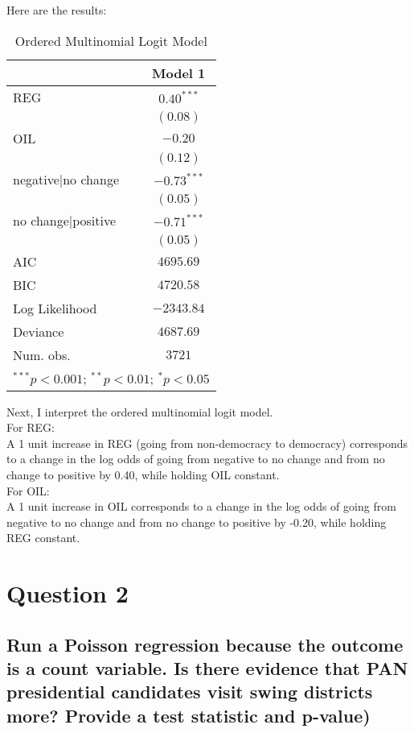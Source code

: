 \documentclass{article}
\begin{document}
Here are the results:
\begin{table} [H]
\begin{center}
\begin{tabular}{l c}
\hline
 & Model 1 \\
\hline
REG                & $0.40^{***}$  \\
                   & $(0.08)$      \\
OIL                & $-0.20$       \\
                   & $(0.12)$      \\
negative|no change & $-0.73^{***}$ \\
                   & $(0.05)$      \\
no change|positive & $-0.71^{***}$ \\ 
                   & $(0.05)$      \\
\hline
AIC                & $4695.69$     \\
BIC                & $4720.58$     \\
Log Likelihood     & $-2343.84$    \\
Deviance           & $4687.69$     \\
Num. obs.          & $3721$        \\
\hline
\multicolumn{2}{l}{\scriptsize{$^{***}p<0.001$; $^{**}p<0.01$; $^{*}p<0.05$}}
\end{tabular}
\caption{Ordered Multinomial Logit Model}
\label{table:coefficients}
\end{center}
\end{table}

Next, I interpret the ordered multinomial logit model.
\\
For REG:
\\
A 1 unit increase in REG (going from non-democracy to democracy) corresponds to a change in the log odds of going from negative to no change and from no change to positive by 0.40, while holding OIL constant. 
\\
For OIL:
\\
A 1 unit increase in OIL corresponds to a change in the log odds of going from negative to no change and from no change to positive by -0.20, while holding REG constant. 


\section{Question 2}
\subsection{Run a Poisson regression because the outcome is a count
variable. Is there evidence that PAN presidential candidates visit swing 
districts more? Provide a test statistic and p-value)}
\end{document}
